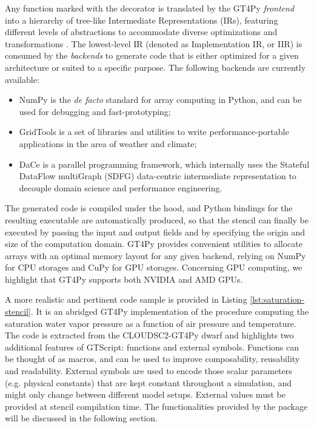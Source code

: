 \documentclass[../main.tex]{subfiles}
\begin{document}
        Any function marked with the  decorator is translated by the GT4Py \emph{frontend} into a hierarchy of tree-like Intermediate Representations (IRs), featuring different levels of abstractions to accommodate diverse optimizations and transformations \citep{gysi21}. The lowest-level IR (denoted as Implementation IR, or IIR) is consumed by the \emph{backends} to generate code that is either optimized for a given architecture or suited to a specific purpose. The following backends are currently available:
        \begin{itemize}
            \item NumPy \citep{harris20} is the \emph{de facto} standard for array computing in Python, and can be used for debugging and fast-prototyping;
            \item GridTools \citep{afanasyev21} is a set of libraries and utilities to write performance-portable applications in the area of weather and climate;
            \item DaCe \citep{ben-nun19} is a parallel programming framework, which internally uses the Stateful DataFlow multiGraph (SDFG) data-centric intermediate representation to decouple domain science and performance engineering.
        \end{itemize}
        The generated code is compiled under the hood, and Python bindings for the resulting executable are automatically produced, so that the stencil can finally be executed by passing the input and output fields and by specifying the origin and size of the computation domain. GT4Py provides convenient utilities to allocate arrays with an optimal memory layout for any given backend, relying on NumPy for CPU storages and CuPy \citep{nishino17} for GPU storages. Concerning GPU computing, we highlight that GT4Py supports both NVIDIA and AMD GPUs.

        A more realistic and pertinent code sample is provided in Listing \ref{lst:saturation-stencil}. It is an abridged GT4Py implementation of the procedure computing the saturation water vapor pressure as a function of air pressure and temperature. The code is extracted from the CLOUDSC2-GT4Py dwarf and highlights two additional features of GTScript: functions and external symbols. Functions can be thought of as macros, and can be used to improve composability, reusability and readability. External symbols are used to encode those scalar parameters (e.g. physical constants) that are kept constant throughout a simulation, and might only change between different model setups. External values must be provided at stencil compilation time. The functionalities provided by the package  will be discussed in the following section.

    \biblio
\end{document}
